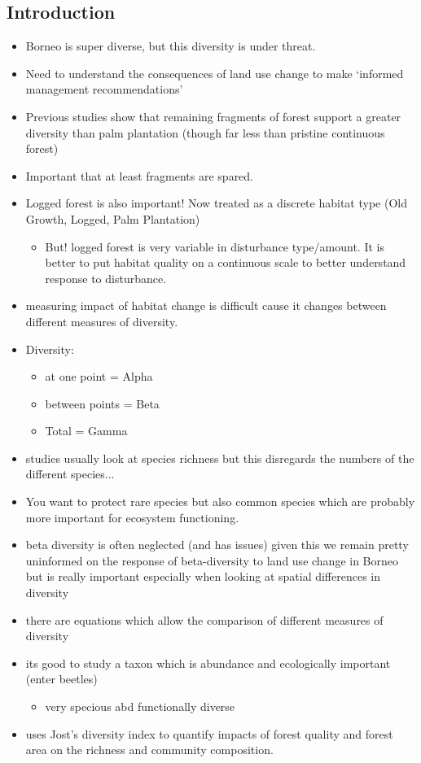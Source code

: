 \subsection*{Introduction}
\begin{itemize}
	\item Borneo is super diverse, but this diversity is under threat.
	\item Need to understand the consequences of land use change to make `informed management recommendations'
	\item Previous studies show that remaining fragments of forest support a greater diversity than palm plantation (though far less than pristine continuous forest)
	\item Important that at least fragments are spared.
	\item Logged forest is also important! Now treated as a discrete habitat type (Old Growth, Logged, Palm Plantation)
	\begin{itemize}
		\item But! logged forest is very variable in disturbance type/amount. It is better to put habitat quality on a continuous scale to better understand response to disturbance.
	\end{itemize}
	\item measuring impact of habitat change is difficult cause it changes between different measures of diversity.
	\item Diversity:
	\begin{itemize}
		\item at one point = Alpha
		\item between points = Beta
		\item Total = Gamma
	\end{itemize}
	\item studies usually look at species richness but this disregards the numbers of the different species...
	\item You want to protect rare species but also common species which are probably more important for ecosystem functioning.
	\item beta diversity is often neglected (and has issues) given this we remain pretty uninformed on the response of beta-diversity to land use change in Borneo but is really important especially when looking at spatial differences in diversity
	\item there are equations which allow the comparison of different measures of diversity
	\item its good to study a taxon which is abundance and ecologically important (enter beetles)
	\begin{itemize}
		\item very specious abd functionally diverse
	\end{itemize}
	\item uses Jost's diversity index to quantify impacts of forest quality and forest area on the richness and community composition.
\end{itemize}

